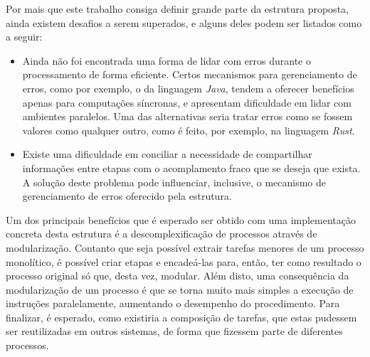 \documentclass[12pt]{article}
\begin{document}
  Por mais que este trabalho consiga definir grande parte da estrutura proposta, ainda existem desafios a serem superados, e alguns deles podem ser listados como a seguir:
  
  \begin{itemize}
    \item Ainda não foi encontrada uma forma de lidar com erros durante o processamento de forma eficiente. Certos mecanismos para gerenciamento de erros, como por exemplo, o da linguagem \textit{Java}, tendem a oferecer benefícios apenas para computações síncronas, e apresentam dificuldade em lidar com ambientes paralelos. Uma das alternativas seria tratar erros como se fossem valores como qualquer outro, como é feito, por exemplo, na linguagem \textit{Rust}.
    \item Existe uma dificuldade em conciliar a necessidade de compartilhar informações entre etapas com o acomplamento fraco que se deseja que exista. A solução deste problema pode influenciar, inclusive, o mecanismo de gerenciamento de erros oferecido pela estrutura.
  \end{itemize}
  
  Um dos principais benefícios que é esperado ser obtido com uma implementação concreta desta estrutura é a descomplexificação de processos através de modularização. Contanto que seja possível extrair tarefas menores de um processo monolítico, é possível criar etapas e encadeá-las para, então, ter como resultado o processo original só que, desta vez, modular. Além disto, uma consequência da modularização de um processo é que se torna muito mais simples a execução de instruções paralelamente, aumentando o desempenho do procedimento. Para finalizar, é esperado, como existiria a composição de tarefas, que estas pudessem ser reutilizadas em outros sistemas, de forma que fizessem parte de diferentes processos.
  
  
  
\end{document}
